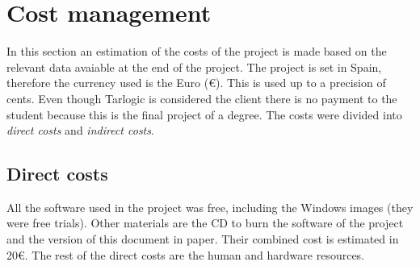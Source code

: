 \section{Cost management}
In this section an estimation of the costs of the project is made based on the relevant data avaiable at the end of the project.
\linej
The project is set in Spain, therefore the currency used is the Euro (\euro{}). This is used up to a precision of cents.
\linej
Even though Tarlogic is considered the client there is no payment to the student because this is the final project of a degree.
\linej
The costs were divided into \textit{direct costs} and \textit{indirect costs}.

\subsection{Direct costs}
All the software used in the project was free, including the Windows images (they were free trials).
\linej
\linej
Other materials are the CD to burn the software of the project and the version of this document in paper.
Their combined cost is estimated in 20\euro{}.
\linej
\linej
The rest of the direct costs are the human and hardware resources.

